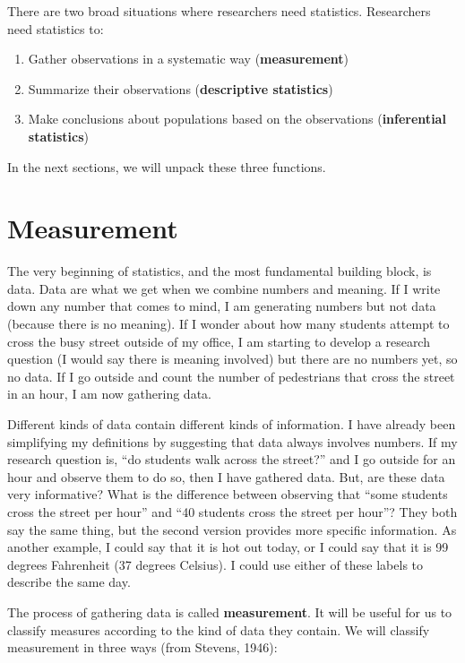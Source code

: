 \documentclass[
]{book}
\providecommand{\tightlist}{%
  \setlength{\itemsep}{0pt}\setlength{\parskip}{0pt}}
\begin{document}
There are two broad situations where researchers need statistics. Researchers need statistics to:

\begin{enumerate}
\def\labelenumi{\arabic{enumi}.}
\tightlist
\item
  Gather observations in a systematic way (\textbf{measurement})
\item
  Summarize their observations (\textbf{descriptive statistics})
\item
  Make conclusions about populations based on the observations (\textbf{inferential statistics})
\end{enumerate}

In the next sections, we will unpack these three functions.

\hypertarget{measurement}{%
\section{Measurement}\label{measurement}}

The very beginning of statistics, and the most fundamental building block, is data. Data are what we get when we combine numbers and meaning. If I write down any number that comes to mind, I am generating numbers but not data (because there is no meaning). If I wonder about how many students attempt to cross the busy street outside of my office, I am starting to develop a research question (I would say there is meaning involved) but there are no numbers yet, so no data. If I go outside and count the number of pedestrians that cross the street in an hour, I am now gathering data.

Different kinds of data contain different kinds of information. I have already been simplifying my definitions by suggesting that data always involves numbers. If my research question is, ``do students walk across the street?'' and I go outside for an hour and observe them to do so, then I have gathered data. But, are these data very informative? What is the difference between observing that ``some students cross the street per hour'' and ``40 students cross the street per hour''? They both say the same thing, but the second version provides more specific information. As another example, I could say that it is hot out today, or I could say that it is 99 degrees Fahrenheit (37 degrees Celsius). I could use either of these labels to describe the same day.

The process of gathering data is called \textbf{measurement}. It will be useful for us to classify measures according to the kind of data they contain. We will classify measurement in three ways (from Stevens, 1946):
\end{document}
